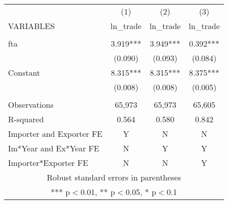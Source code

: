 \documentclass[]{article}
\begin{document}
\begin{tabular}{lccc} \hline
 & (1) & (2) & (3) \\
VARIABLES & ln\_trade & ln\_trade & ln\_trade \\ \hline
 &  &  &  \\
fta & 3.919*** & 3.949*** & 0.392*** \\
 & (0.090) & (0.093) & (0.084) \\
Constant & 8.315*** & 8.315*** & 8.375*** \\
 & (0.008) & (0.008) & (0.005) \\
 &  &  &  \\
Observations & 65,973 & 65,973 & 65,605 \\
R-squared & 0.564 & 0.580 & 0.842 \\
Importer and Exporter FE & Y & N & N \\
Im*Year and Ex*Year FE & N & Y & Y \\
 Importer*Exporter FE & N & N & Y \\ \hline
\multicolumn{4}{c}{ Robust standard errors in parentheses} \\
\multicolumn{4}{c}{ *** p$<$0.01, ** p$<$0.05, * p$<$0.1} \\
\end{tabular}
\end{document}
